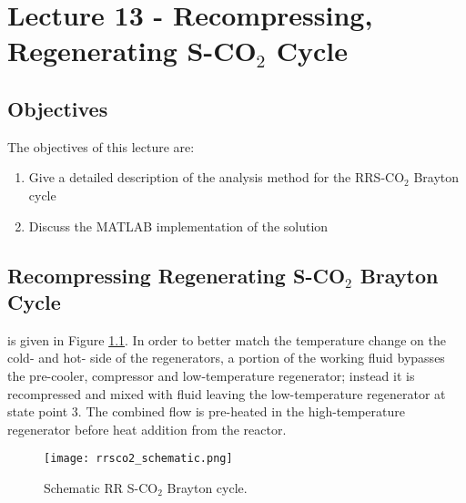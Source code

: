 \chapter{Lecture 13 - Recompressing, Regenerating S-CO$_{2}$ Cycle}
\label{ch:ch13}
\section{Objectives}
The objectives of this lecture are:
\begin{enumerate}
\item Give a detailed description of the analysis method for the RRS-CO$_{2}$ Brayton cycle
\item Discuss the MATLAB implementation of the solution
\end{enumerate}

\section{Recompressing Regenerating S-CO$_{2}$ Brayton Cycle}
 is given in Figure \ref{fig:rrsco2_schematic}. In order to better match the temperature change on the cold- and hot- side of the regenerators, a portion of the working fluid bypasses the pre-cooler, compressor and low-temperature regenerator; instead it is recompressed and mixed with fluid leaving the low-temperature regenerator at state point 3.  The combined flow is pre-heated in the high-temperature regenerator before heat addition from the reactor.


\begin{figure}
\texttt{[image: rrsco2\_schematic.png]}
\caption{Schematic RR S-CO$_{2}$ Brayton cycle.}
\label{fig:rrsco2_schematic}
\end{figure}

